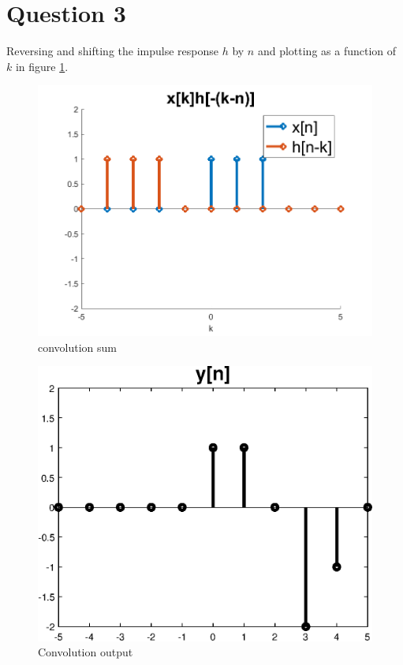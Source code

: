 \documentclass[12pt,letterpaper]{article}
\begin{document}
\section*{Question 3}
Reversing and shifting the impulse response $h$ by $n$ and plotting as a function of $k$ in figure \ref{conv_sum}. 
\begin{figure}[h]
    \centering
    \includegraphics{figures/3in.png}
    \caption{convolution sum}
    \label{conv_sum}
\end{figure}
\begin{figure}[h]
    \centering
    \includegraphics{figures/3.eps}
    \caption{Convolution output}
    \label{conv}
\end{figure}
\end{document}
